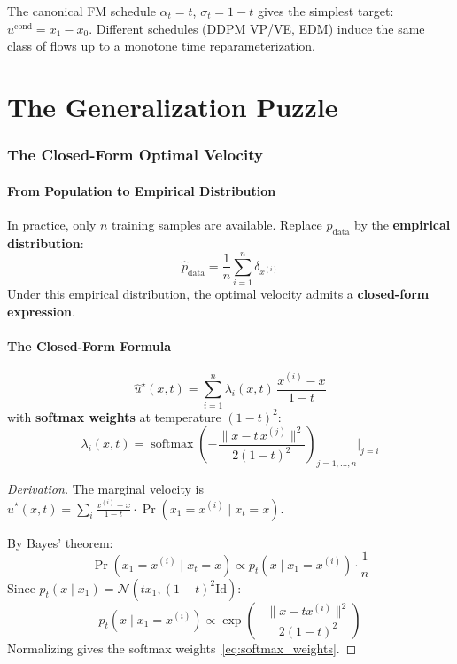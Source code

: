 \documentclass[11pt, a4paper]{article}
\newcommand{\Id}{\mathrm{Id}}
\newcommand{\pdata}{p_{\mathrm{data}}}
\newcommand{\softmax}{\operatorname{softmax}}
\theoremstyle{plain}
\theoremstyle{definition}
\theoremstyle{remark}
\begin{document}
The canonical FM schedule $\alpha_t = t$, $\sigma_t = 1-t$ gives the simplest target: $u^{\mathrm{cond}} = x_1 - x_0$. Different schedules (DDPM VP/VE, EDM) induce the same class of flows up to a monotone time reparameterization.

\part{The Generalization Puzzle}

\section{The Closed-Form Optimal Velocity}
\label{sec:closed_form}

\subsection{From Population to Empirical Distribution}

In practice, only $n$ training samples are available. Replace $\pdata$ by the \textbf{empirical distribution}:
\[
  \hat{p}_{\mathrm{data}} = \frac{1}{n} \sum_{i=1}^n \delta_{x^{(i)}}
\]
Under this empirical distribution, the optimal velocity admits a \textbf{closed-form expression}.

\subsection{The Closed-Form Formula}

\begin{thmbox}
\begin{equation}
  \hat{u}^\star(x, t) = \sum_{i=1}^n \lambda_i(x, t)\,\frac{x^{(i)} - x}{1-t}
  \label{eq:closed_form}
\end{equation}
with \textbf{softmax weights} at temperature $(1-t)^2$:
\begin{equation}
  \lambda_i(x, t) = \softmax\!\left(-\frac{\|x - t\,x^{(j)}\|^2}{2(1-t)^2}\right)_{j=1,\ldots,n}\!\Bigg|_{j=i}
  \label{eq:softmax_weights}
\end{equation}
\end{thmbox}

\begin{proof}[Derivation]
The marginal velocity is $\hat{u}^\star(x,t) = \sum_i \frac{x^{(i)}-x}{1-t} \cdot \Pr(x_1 = x^{(i)} \mid x_t = x)$.

By Bayes' theorem:
\[
  \Pr(x_1 = x^{(i)} \mid x_t = x) \propto p_t(x \mid x_1=x^{(i)}) \cdot \frac{1}{n}
\]
Since $p_t(x \mid x_1) = \mathcal{N}(tx_1, (1-t)^2\Id)$:
\[
  p_t(x \mid x_1 = x^{(i)}) \propto \exp\!\left(-\frac{\|x-tx^{(i)}\|^2}{2(1-t)^2}\right)
\]
Normalizing gives the softmax weights~\eqref{eq:softmax_weights}.
\end{proof}
\end{document}
